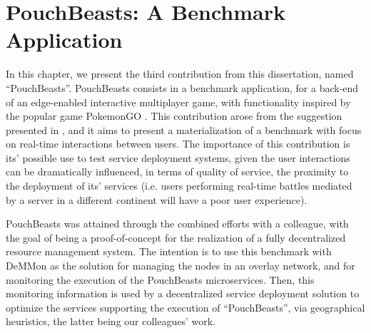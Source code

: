 

\chapter{PouchBeasts: A Benchmark Application}
\label{cha:benchmark}

In this chapter, we present the third contribution from this dissertation, named ``PouchBeasts''. PouchBeasts consists in a benchmark application, for a back-end of an edge-enabled interactive multiplayer game, with functionality inspired by the popular game PokemonGO . This contribution arose from the suggestion presented in , and it aims to present a materialization of a benchmark with focus on real-time interactions between users. The importance of this contribution is its' possible use to test service deployment systems, given the user interactions can be dramatically influenced, in terms of quality of service, the proximity to the deployment of its' services (i.e. users performing real-time battles mediated by a server in a different continent will have a poor user experience).


PouchBeasts was attained through the combined efforts with a colleague, with the goal of being a proof-of-concept for the realization of a fully decentralized resource management system. The intention is to use this benchmark with DeMMon as the solution for managing the nodes in an overlay network, and for monitoring the execution of the PouchBeasts microservices. Then, this monitoring information is used by a decentralized service deployment solution to optimize the services supporting the execution of ``PouchBeasts'', via geographical heuristics, the latter being our colleagues' work.

